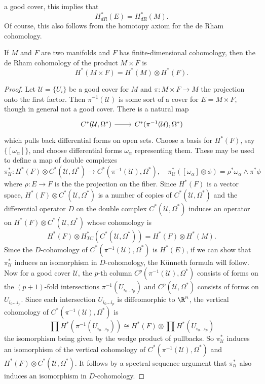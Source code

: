 a good cover, this implies that
\[H^*_{dR}(E)=H^*_{dR}(M).\]
Of course, this also follows from the homotopy axiom for the de Rham cohomology.
\begin{proposition}
If $M$ and $F$ are two manifolds and $F$ has finite-dimensional cohomology, then the de Rham cohomology of the product $M\times F$ is
\[H^*(M\times F)=H^*(M)\otimes H^*(F).\]
\end{proposition}
\begin{proof}
Let $\mathcal{U}=\{U_i\}$ be a good cover for $M$ and $\pi:M\times F\to M$ the projection onto the first factor. Then $\pi^{-1}(\mathcal{U})$ is some sort of a cover for 
$E=M\times F$, though in general not a good cover. There is a natural map
\[\begin{tikzcd}
C^*(\mathcal{U},\Omega^*)\ar[r]&C^*(\pi^{-1}(\mathcal{U}),\Omega^*)
\end{tikzcd}\]
which pulls back differential forms on open sets. Choose a basis for $H^*(F)$, say $\{[\omega_\alpha]\}$, and choose differential forms $\omega_\alpha$ representing them. 
These may be used to define a map of double complexes
\[\pi^*_{\mathcal{U}}:H^*(F)\otimes C^*(\mathcal{U},\Omega^*)\to C^*(\pi^{-1}(\mathcal{U}),\Omega^*),\quad \pi^*_{\mathcal{U}}([\omega_\alpha]\otimes\phi)=\rho^*\omega_\alpha\wedge\pi^*\phi\]
where $\rho:E\to F$ is the the projection on the fiber. Since $H^*(F)$ is a vector space, $H^*(F)\otimes C^*(\mathcal{U},\Omega^*)$ is a number of copies of $C^*(\mathcal{U},\Omega^*)$ 
and the differential operator $D$ on the double complex $C^*(\mathcal{U},\Omega^*)$ induces an operator on $H^*(F)\otimes C^*(\mathcal{U},\Omega^*)$ whose cohomology is
\[H^*(F)\otimes H_{TC}^*(C^*(\mathcal{U},\Omega^*))=H^*(F)\otimes H^*(M).\]
Since the $D$-cohomology of $C^*(\pi^{-1}(\mathcal{U}),\Omega^*)$ is $H^*(E)$, if we can show that $\pi^*_{\mathcal{U}}$ induces an isomorphism in $D$-cohomology, the 
K\"unneth formula will follow. Now for a good cover $\mathcal{U}$, the $p$-th column $C^p(\pi^{-1}(\mathcal{U}),\Omega^*)$ consists of forms on the $(p+1)$-fold 
intersections $\pi^{-1}(U_{i_0\dots i_p})$ and $C^p(\mathcal{U},\Omega^*)$ consists of forms on $U_{i_0\dots i_p}$. Since each intersection $U_{i_0\dots i_p}$ is 
diffeomorphic to $\R^n$, the vertical cohomology of $C^*(\pi^{-1}(\mathcal{U}),\Omega^*)$ is
\[\prod H^*(\pi^{-1}(U_{i_0\dots i_p}))\cong H^*(F)\otimes\prod H^*(U_{i_0\dots i_p})\]
the isomorphism being given by the wedge product of pullbacks. So $\pi^*_{\mathcal{U}}$ induces an isomorphism of the vertical cohomology of $C^*(\pi^{-1}(\mathcal{U}),\Omega^*)$ 
and $H^*(F)\otimes C^*(\mathcal{U},\Omega^*)$. It follows by a spectral sequence argument that $\pi_{\mathcal{U}}^*$ also induces an isomorphism in $D$-cohomology. 
\end{proof}
